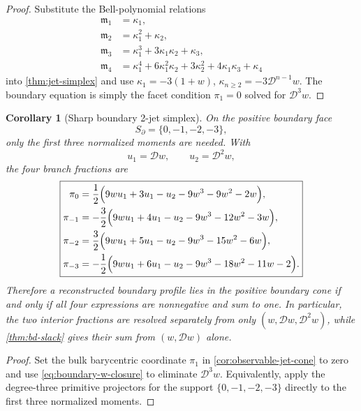 \documentclass[aps,prd,preprint,onecolumn,nofootinbib,superscriptaddress,showkeys]{revtex4-2}
\numberwithin{equation}{section}
\theoremstyle{definition}
\theoremstyle{plain}
\newtheorem{corollary}{Corollary}[section]
\newcommand{\Dil}{\mathscr D}
\begin{document}
\begin{proof}
Substitute the Bell-polynomial relations
\begin{align*}
\mathfrak m_1&=\kappa_1,\\
\mathfrak m_2&=\kappa_1^2+\kappa_2,\\
\mathfrak m_3&=\kappa_1^3+3\kappa_1\kappa_2+\kappa_3,\\
\mathfrak m_4&=\kappa_1^4+6\kappa_1^2\kappa_2+3\kappa_2^2+4\kappa_1\kappa_3+\kappa_4
\end{align*}
into \cref{thm:jet-simplex} and use $\kappa_1=-3(1+w)$, $\kappa_{n\ge2}=-3\Dil^{n-1}w$.  The boundary equation is simply the facet condition $\pi_1=0$ solved for $\Dil^3w$.
\end{proof}

\begin{corollary}[Sharp boundary 2-jet simplex]\label{cor:boundary-jet-simplex}
On the positive boundary face
\[
S_\partial=\{0,-1,-2,-3\},
\]
only the first three normalized moments are needed.  With
\[
u_1=\Dil w,
\qquad
u_2=\Dil^2w,
\]
the four branch fractions are
\begin{equation}
\boxed{
\begin{aligned}
\pi_0
&=\frac12\Bigl(9wu_1+3u_1-u_2-9w^3-9w^2-2w\Bigr),\\
\pi_{-1}
&=-\frac32\Bigl(9wu_1+4u_1-u_2-9w^3-12w^2-3w\Bigr),\\
\pi_{-2}
&=\frac32\Bigl(9wu_1+5u_1-u_2-9w^3-15w^2-6w\Bigr),\\
\pi_{-3}
&=-\frac12\Bigl(9wu_1+6u_1-u_2-9w^3-18w^2-11w-2\Bigr).
\end{aligned}
}
\end{equation}
Therefore a reconstructed boundary profile lies in the positive boundary cone if and only if all four expressions are nonnegative and sum to one.  In particular, the two interior fractions are resolved separately from only $(w,\Dil w,\Dil^2w)$, while \cref{thm:bd-slack} gives their sum from $(w,\Dil w)$ alone.
\end{corollary}

\begin{proof}
Set the bulk barycentric coordinate $\pi_1$ in \cref{cor:observable-jet-cone} to zero and use \cref{eq:boundary-w-closure} to eliminate $\Dil^3w$.  Equivalently, apply the degree-three primitive projectors for the support $\{0,-1,-2,-3\}$ directly to the first three normalized moments.
\end{proof}
\end{document}

